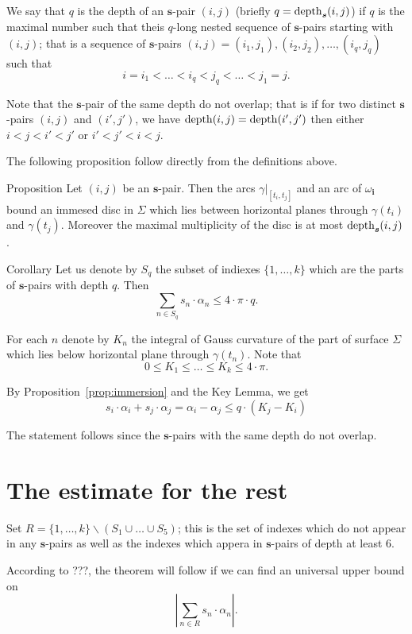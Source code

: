 \documentclass[a4paper,10pt]{amsart}
\begin{document}
We say that $q$ is the depth of an $\bm{s}$-pair $(i,j)$
(briefly $q=\mathop{\rm depth}\nolimits_{\bm{s}}(i,j)$) 
if $q$ is the maximal number such that theis $q$-long nested sequence of $\bm{s}$-pairs starting with $(i,j)$; 
that is a sequence of $\bm{s}$-pairs
$(i,j)=(i_1,j_1),(i_2,j_2),\dots,(i_q,j_q)$ such that
\[i=i_1<\dots<i_q<j_q<\dots<j_1=j.\]

Note that the $\bm{s}$-pair of the same depth do not overlap;
that is if for two distinct $\bm{s}$-pairs $(i,j)$ and $(i',j')$,
we have $\mathop{\rm depth}\nolimits(i,j)=\mathop{\rm depth}\nolimits(i',j')$
then either $i<j<i'<j'$ or $i'<j'<i<j$.

The following proposition follow directly from the definitions above.

\begin{thm}{Proposition}\label{prop:immersion}
Let $(i,j)$ be an $\bm{s}$-pair.
Then the arcs $\gamma|_{[t_i,t_j]}$ and an arc of $\omega_{\bm{i}}$ bound an immesed disc in $\Sigma$ which lies between horizontal planes through $\gamma(t_i)$ and $\gamma(t_j)$.
Moreover the maximal multiplicity of the disc is at most $\mathop{\rm depth}\nolimits_{\bm{s}}(i,j)$.
\end{thm}


\begin{thm}{Corollary}
Let us denote by $S_q$  the subset of indiexes $\{1,\dots,k\}$
which are the parts of $\bm{s}$-pairs with depth $q$.
Then
\[\sum_{n\in S_q}s_n\cdot\alpha_n\le 4\cdot\pi\cdot q.\]
\end{thm}

 For each $n$ denote by $K_n$ the integral of Gauss curvature of the part of surface $\Sigma$ which lies below horizontal plane through $\gamma(t_n)$.
Note that 
\[0\le K_1\le\dots\le K_k\le 4\cdot\pi.\]


By Proposition~\ref{prop:immersion} and the Key Lemma,
we get
\[s_i\cdot\alpha_i+s_j\cdot\alpha_j=\alpha_i-\alpha_j\le q\cdot (K_j-K_i)\]

The statement follows since the $\bm{s}$-pairs with the same depth do not overlap.
\qeds


\section{The estimate for the rest}

Set $R=\{1,\dots,k\}\backslash (S_1\cup\dots\cup S_5)$;
this is the set of indexes which do not appear in any $\bm{s}$-pairs
as well as the indexes which appera in $\bm{s}$-pairs of depth at least $6$.

According to ???, the theorem will follow if we can find an universal upper bound on 
\[|\sum_{n\in R}s_n\cdot \alpha_n|.\]
\end{document}
